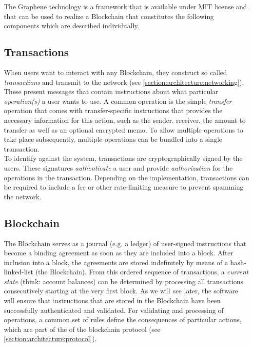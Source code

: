 The Graphene technology is a framework that is available under MIT license and that can be used to realize a Blockchain that constitutes the following components which are described
individually.

\subsection{ Transactions }
\label{section:architecture:transactions}

When users want to interact with any Blockchain, they construct so called \emph{transactions} and transmit to the network (see \cref{section:architecture:networking}). These present messages that contain instructions about what particular \emph{operation(s)} a user wants to use. A common operation is the simple \emph{transfer} operation that comes with transfer-specific instructions that provides the necessary information for this action, such as the sender, receiver, the amount to transfer as well as an optional encrypted memo. To allow multiple operations to take place subsequently, multiple operations can be bundled into a single transaction.\\
To identify against the system, transactions are cryptographically signed by the users. These signatures \emph{authenticate} a user and provide \emph{authorization} for the operations in the transaction. Depending on the implementation, 
transactions can be required to include a fee or other rate-limiting measure to prevent spamming the network.

\subsection{ Blockchain }

The Blockchain serves as a journal (e.g. a ledger) of user-signed instructions that become a binding agreement as soon as they are included into a block. After inclusion into a block, the agreements are stored indefinitely by means of a hash-linked-list (the Blockchain). From this ordered sequence of transactions, a \emph{current state} (think: account balances) can be determined by processing all transactions consecutively starting at the very first block. As we will see later, the software will ensure that instructions that are stored in the Blockchain have been successfully authenticated and validated. For validating and processing of operations, a common set of rules define the consequences of particular actions, which are part of the of the blockchain protocol (see \cref{section:architecture:protocol}).

